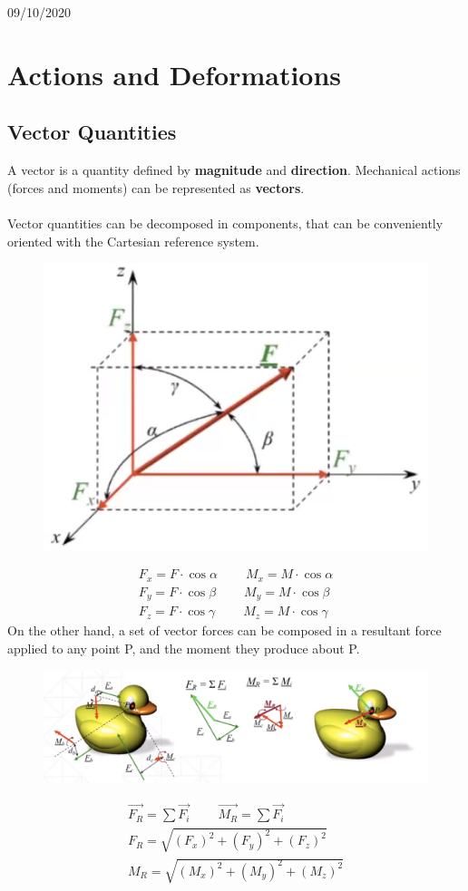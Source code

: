 \documentclass[class=report, crop=false, 12pt,a4paper]{standalone}
\begin{document}
\begin{center}
    09/10/2020
\end{center}
\section{Actions and Deformations}
\subsection{Vector Quantities}
A vector is a quantity defined by \textbf{magnitude} and \textbf{direction}. Mechanical actions (forces and moments) can be represented as \textbf{vectors}. \\\\
Vector quantities can be decomposed in components, that can be conveniently oriented with the Cartesian reference system.
\begin{figure}[H]
  \centering
  \includegraphics[width = 0.5 \textwidth]{../img/vectordecomposition.PNG}
\end{figure}
\begin{gather*}
  F_x = F \cdot \cos \alpha \ \ \ \ \ \ \ \ \ \ M_x = M \cdot \cos \alpha \\
  F_y = F \cdot \cos \beta \ \ \ \ \ \ \ \ \ \ M_y = M \cdot \cos \beta \\
  F_z = F \cdot \cos \gamma \ \ \ \ \ \ \ \ \ \ M_z = M \cdot \cos \gamma
\end{gather*}
On the other hand, a set of vector forces can be composed in a resultant force applied to any point P, and the moment they produce about P. 
\begin{figure}[H]
  \centering
  \includegraphics[width = 1 \textwidth]{../img/forcesandmoments.PNG}
\end{figure}
\begin{gather*}
  \vec{F_R} = \sum \vec{F_i} \ \ \ \ \ \ \ \ \ \ \vec{M_R} = \sum \vec{F_i} \\
  F_R = \sqrt{(F_x)^2 + (F_y)^2 + (F_z)^2} \\
  M_R = \sqrt{(M_x)^2 + (M_y)^2 + (M_z)^2}
\end{gather*}
\end{document}
